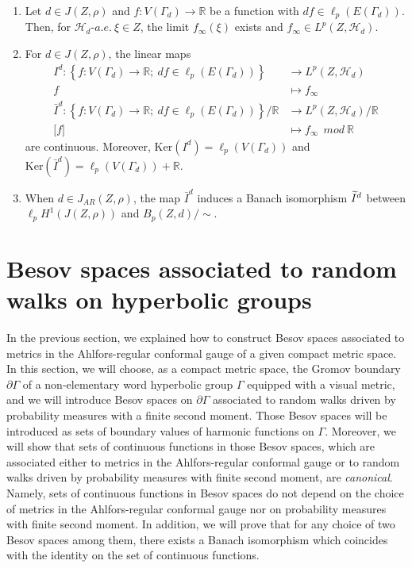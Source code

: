 \documentclass[AHL,Unicode,longabstracts,published]{cedram}
\newcommand{\ch}{\mathcal{H}}
\newcommand{\br}{\mathbb{R}}
\newcommand{\Ker}{\mathrm{Ker}}
\let\oldtilde\tilde
\renewcommand*{\tilde}[1]{\mathchoice{\widetilde{#1}}{\widetilde{#1}}{\oldtilde{#1}}{\oldtilde{#1}}}
\begin{document}
\begin{theo}\label{besov}\leavevmode
\begin{enumerate}
\item\label{theo4.6.1} Let $d\in J(Z,\rho)$ and $f:V(\Gamma_{d})\to\br$ be a function with $df\in\ell_p(E(\Gamma_{d}))$. Then, for $\ch_{d}$-$a.e.\ \xi\in Z$, the limit $f_{\infty}(\xi)$ exists and $f_{\infty}\in L^p(Z,\ch_{d})$.
\item\label{theo4.6.2} For $d\in J(Z,\rho)$, the linear maps
\begin{align*}
I^{d}: \left\{f:V(\Gamma_{d})\rightarrow\br;\ df\in\ell_p(E(\Gamma_{d})) \right\}&\rightarrow L^p(Z,\ch_{d})\\
f &\mapsto f_{\infty}\\
\bar{I}^{d}:\left\{f:V(\Gamma_{d})\rightarrow\br;\ df\in\ell_p(E(\Gamma_{d}))\right\}/\br&\rightarrow L^p(Z,\ch_{d})/\br\\
\lbrack f \rbrack&\mapsto f_{\infty}\ \ mod\ \br
\end{align*}
are continuous. Moreover, $\Ker(I^d)=\ell_p(V(\Gamma_{d}))$ and $\Ker(\bar{I}^d)=\ell_p(V(\Gamma_{d}))+\br$.

\item When $d\in J_{AR}(Z,\rho)$, the map $\bar{I}^{d}$ induces a Banach isomorphism $\tilde{I}^{d}$ between $\ell_pH^1(J(Z,\rho))$ and $B_p(Z,d)/\sim$.
\end{enumerate}
\end{theo}

\section{Besov spaces associated to random walks on hyperbolic groups}\label{besov-hg}
In the previous section, we explained how to construct Besov spaces associated to metrics in the Ahlfors-regular conformal gauge of a given compact metric space. In this section, we will choose, as a compact metric space, the Gromov boundary $\partial\Gamma$ of a non-elementary word hyperbolic group $\Gamma$ equipped with a visual metric, and we will introduce Besov spaces on $\partial\Gamma$ associated to random walks driven by probability measures with a finite second moment. Those Besov spaces will be introduced as sets of boundary values of harmonic functions on $\Gamma$. Moreover, we will show that sets of continuous functions in those Besov spaces, which are associated either to metrics in the Ahlfors-regular conformal gauge or to random walks driven by probability measures with finite second moment, are \emph{canonical}. Namely, sets of continuous functions in Besov spaces do not depend on the choice of metrics in the Ahlfors-regular conformal gauge nor on probability measures with finite second moment. In addition, we will prove that for any choice of two Besov spaces among them, there exists a Banach isomorphism which coincides with the identity on the set of continuous functions.
\end{document}
